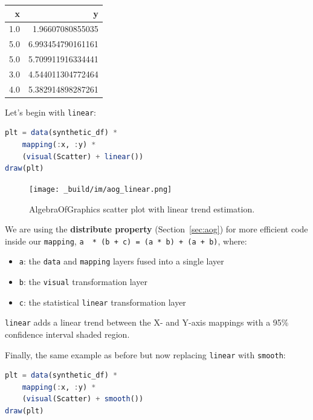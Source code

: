 \documentclass[
  notoc %
]{tufte-book}
\providecommand{\tightlist}{%
  \setlength{\itemsep}{0pt}\setlength{\parskip}{0pt}
}
\newcommand{\passthrough}[1]{#1}
\begin{document}
\begin{longtable}[]{@{}rr@{}}
\toprule
x & y \\
\midrule
\endhead
1.0 & 1.96607080855035 \\
5.0 & 6.993454790161161 \\
5.0 & 5.709911916334441 \\
3.0 & 4.544011304772464 \\
4.0 & 5.382914898287261 \\
\bottomrule
\end{longtable}

Let's begin with \passthrough{\lstinline!linear!}:

\begin{lstlisting}[language=Julia]
plt = data(synthetic_df) *
    mapping(:x, :y) *
    (visual(Scatter) + linear())
draw(plt)
\end{lstlisting}

\begin{figure}
\hypertarget{fig:aog_linear}{%
\centering
\texttt{[image: \_build/im/aog\_linear.png]}
\caption{AlgebraOfGraphics scatter plot with linear trend
estimation.}\label{fig:aog_linear}
}
\end{figure}

We are using the \textbf{distribute property} (Section~\ref{sec:aog})
for more efficient code inside our \passthrough{\lstinline!mapping!},
\passthrough{\lstinline!a  * (b + c) = (a * b) + (a + b)!}, where:

\begin{itemize}
\tightlist
\item
  \passthrough{\lstinline!a!}: the \passthrough{\lstinline!data!} and
  \passthrough{\lstinline!mapping!} layers fused into a single layer
\item
  \passthrough{\lstinline!b!}: the \passthrough{\lstinline!visual!}
  transformation layer
\item
  \passthrough{\lstinline!c!}: the statistical
  \passthrough{\lstinline!linear!} transformation layer
\end{itemize}

\passthrough{\lstinline!linear!} adds a linear trend between the X- and
Y-axis mappings with a 95\% confidence interval shaded region.

Finally, the same example as before but now replacing
\passthrough{\lstinline!linear!} with \passthrough{\lstinline!smooth!}:

\begin{lstlisting}[language=Julia]
plt = data(synthetic_df) *
    mapping(:x, :y) *
    (visual(Scatter) + smooth())
draw(plt)
\end{lstlisting}
\end{document}
